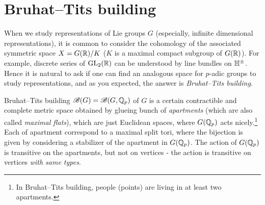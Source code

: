 \section{Bruhat--Tits building}
\label{sec:building}

When we study representations of Lie groups $G$ (especially, infinite dimensional representations), it is common to consider the cohomology of the associated symmetric space $X = G(\mathbb{R}) / K$ ($K$ is a maximal compact subgroup of $G(\mathbb{R})$).
For example, discrete series of $\mathrm{GL}_2(\mathbb{R})$ can be understood by line bundles on $\mathbb{H}^\pm$.
Hence it is natural to ask if one can find an analogous space for $p$-adic groups to study representations, and as you expected, the answer is \emph{Bruhat--Tits building}.

Bruhat--Tits building $\mathscr{B}(G) = \mathscr{B}(G, \mathbb{Q}_p)$ of $G$ is a certain contractible and complete metric space obtained by glueing bunch of \emph{apartments} (which are also called \emph{maximal flats}), which are just Euclidean spaces, where $G(\mathbb{Q}_p)$ acts nicely.\footnote{In Bruhat--Tits building, people (points) are living in at least two apartments.}
Each of apartment correspond to a maximal split tori, where the bijection is given by considering a stabilizer of the apartment in $G(\mathbb{Q}_p)$.
The action of $G(\mathbb{Q}_p)$ is transitive on the apartments, but not on vertices - the action is transitive on vertices \emph{with same types}.


